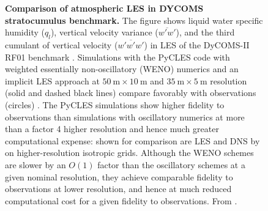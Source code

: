 \documentclass{article}
\begin{document}
\begin{itemize}
\begin{figure}[htb]
      \caption{\textbf{Comparison of atmospheric LES in DYCOMS stratocumulus benchmark.} The figure shows liquid water specific humidity ($q_l$), vertical velocity variance ($\overline{w'w'}$), and the third cumulant of vertical velocity ($\overline{w'w'w'}$) in LES of the DyCOMS-II RF01 benchmark \citep{Stevens03,Stevens05a}. Simulations with the PyCLES code with weighted essentially non-oscillatory (WENO) numerics and an implicit LES approach at $50~\mathrm{m} \times 10~\mathrm{m}$ and $35~\mathrm{m} \times 5~\mathrm{m}$ resolution (solid and dashed black lines) compare favorably with observations (circles) \citep{Pressel15a,Pressel17a}. The PyCLES simulations show higher fidelity to observations than simulations with oscillatory numerics at more than a factor 4 higher resolution and hence much greater computational expense: shown for comparison are LES \citet{Matheou18a} and DNS by \citet{Mellado18a} on higher-resolution isotropic grids. Although the WENO schemes are slower by an $O(1)$ factor than the oscillatory schemes at a given nominal resolution, they achieve comparable fidelity to observations at lower resolution, and hence at much reduced computational cost for a given fidelity to observations. From \citet{Schneider19a}.}\label{f:DYCOMS-test}
 \end{figure}


\end{itemize}
\end{document}
